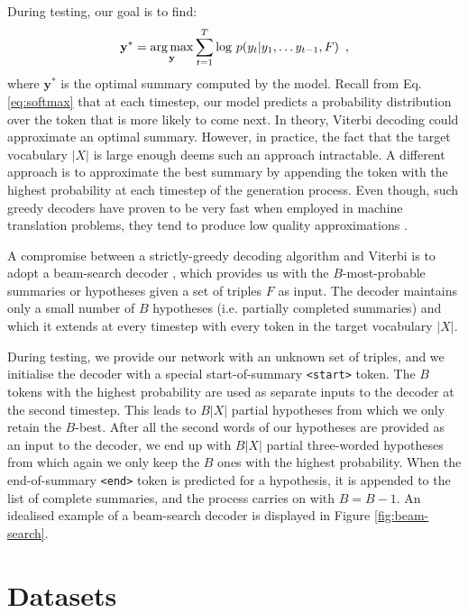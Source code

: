 \documentclass[preprint,5p]{elsarticle}
\begin{document}
During testing, our goal is to find:
\begin{align}
  \mathbf{y^*} = \operatornamewithlimits{\arg \max}\limits_{\mathbf{y}} \sum_{t=1}^{T} \log\,p(y_t|y_1, \ldots y_{t-1}, F)\enspace,
\end{align}where $\mathbf{y^*}$ is the optimal summary computed by the model. Recall from Eq. \ref{eq:softmax} that at each timestep, our model predicts a probability distribution over the token that is more likely to come next. In theory, Viterbi decoding could approximate an optimal summary. However, in practice, the fact that the target vocabulary $|X|$ is large enough deems such an approach intractable. A different approach is to approximate the best summary by appending the token with the highest probability at each timestep of the generation process. Even though, such greedy decoders have proven to be very fast when employed in machine translation problems, they tend to produce low quality approximations \cite{Rush2015}.

A compromise between a strictly-greedy decoding algorithm and Viterbi is to adopt a beam-search decoder \cite{Sutskever2014}, which provides us with the $B$-most-probable summaries or hypotheses given a set of triples $F$ as input. The decoder maintains only a small number of $B$ hypotheses (i.e. partially completed summaries) and which it extends at every timestep with every token in the target vocabulary $|X|$.

During testing, we provide our network with an unknown set of triples, and we initialise the decoder with a special start-of-summary \texttt{<start>} token. The $B$ tokens with the highest probability are used as separate inputs to the decoder at the second timestep. This leads to $B|X|$ partial hypotheses from which we only retain the $B$-best. After all the second words of our hypotheses are provided as an input to the decoder, we end up with $B|X|$ partial three-worded hypotheses from which again we only keep the $B$ ones with the highest probability. When the end-of-summary \texttt{<end>} token is predicted for a hypothesis, it is appended to the list of complete summaries, and the process carries on with $B=B-1$. An idealised example of a beam-search decoder is displayed in Figure \ref{fig:beam-search}.



\section{Datasets}
\label{sec:Dataset}
\end{document}
